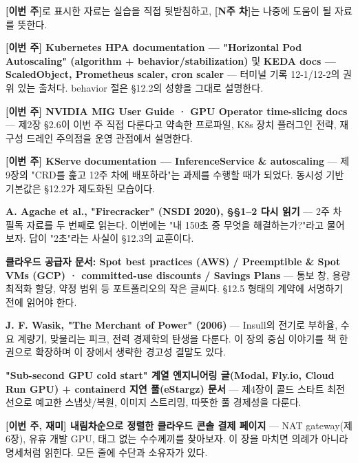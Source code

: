

\textbf{[이번 주]}로 표시한 자료는 실습을 직접 뒷받침하고, \textbf{[N주 차]}는 나중에 도움이 될 자료를 뜻한다.

\begin{tbbitemize}
  \item \textbf{[이번 주] Kubernetes HPA documentation — "Horizontal Pod Autoscaling" (algorithm + behavior/stabilization)} 및 \textbf{KEDA docs — ScaledObject, Prometheus scaler, cron scaler} — 터미널 기록 12-1/12-2의 권위 있는 출처다. behavior 절은 §12.2의 성향을 그대로 설명한다.
  \item \textbf{[이번 주] NVIDIA MIG User Guide · GPU Operator time-slicing docs} — 제2장 §2.6이 이번 주 직접 다룬다고 약속한 프로파일, K8s 장치 플러그인 전략, 재구성 드레인 주의점을 운영 관점에서 설명한다.
  \item \textbf{[이번 주] KServe documentation — InferenceService \& autoscaling} — 제9장의 "CRD를 훑고 12주 차에 배포하라"는 과제를 수행할 때가 되었다. 동시성 기반 기본값은 §12.2가 제도화된 모습이다.
  \item \textbf{A. Agache et al., "Firecracker" (NSDI 2020), §§1–2 다시 읽기} — 2주 차 필독 자료를 두 번째로 읽는다. 이번에는 "내 150초 중 무엇을 해결하는가?"라고 물어보자. 답이 "2초"라는 사실이 §12.3의 교훈이다.
  \item \textbf{클라우드 공급자 문서: Spot best practices (AWS) / Preemptible \& Spot VMs (GCP) · committed-use discounts / Savings Plans} — 통보 창, 용량 최적화 할당, 약정 범위 등 포트폴리오의 작은 글씨다. §12.5 형태의 계약에 서명하기 전에 읽어야 한다.
  \item \textbf{J. F. Wasik, "The Merchant of Power" (2006)} — Insull의 전기로 부하율, 수요 계량기, 맞물리는 피크, 전력 경제학의 탄생을 다룬다. 이 장의 중심 이야기를 책 한 권으로 확장하며 이 장에서 생략한 경고성 결말도 있다.
  \item \textbf{"Sub-second GPU cold start" 계열 엔지니어링 글(Modal, Fly.io, Cloud Run GPU) + containerd 지연 풀(eStargz) 문서} — 제4장이 콜드 스타트 최전선으로 예고한 스냅샷/복원, 이미지 스트리밍, 따뜻한 풀 경제성을 다룬다.
  \item \textbf{[이번 주, 재미] 내림차순으로 정렬한 클라우드 콘솔 결제 페이지} — NAT gateway(제6장), 유휴 개발 GPU, 태그 없는 수수께끼를 찾아보자. 이 장을 마치면 의례가 아니라 명세처럼 읽힌다. 모든 줄에 수단과 소유자가 있다.
\end{tbbitemize}

